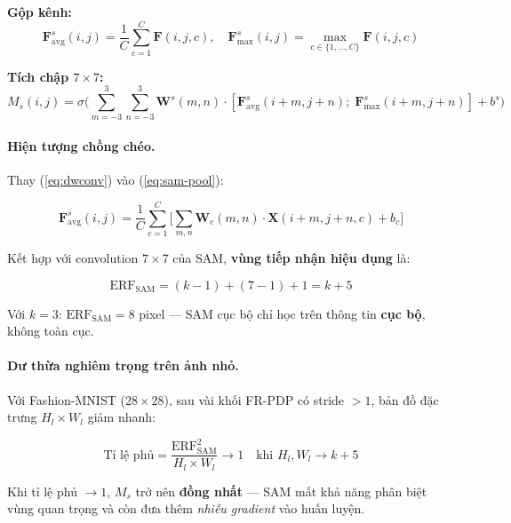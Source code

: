 \documentclass[
]{article}
\begin{document}
\textbf{Gộp kênh:}
\begin{equation}
\mathbf{F}_{\text{avg}}^s(i,j) = \frac{1}{C}\sum_{c=1}^{C} \mathbf{F}(i,j,c), \quad
\mathbf{F}_{\text{max}}^s(i,j) = \max_{c \in \{1,\ldots,C\}} \mathbf{F}(i,j,c)
\label{eq:sam-pool}
\end{equation}

\textbf{Tích chập $7 \times 7$:}
\begin{equation}
M_s(i,j) = \sigma\Bigg(\sum_{m=-3}^{3}\sum_{n=-3}^{3} \mathbf{W}^s(m,n) \cdot [\mathbf{F}_{\text{avg}}^s(i+m,j+n);\; \mathbf{F}_{\text{max}}^s(i+m,j+n)] + b^s\Bigg)
\label{eq:sam-conv}
\end{equation}

\paragraph{Hiện tượng chồng chéo.}

Thay (\ref{eq:dwconv}) vào (\ref{eq:sam-pool}):

\begin{equation}
\mathbf{F}_{\text{avg}}^s(i,j) = \frac{1}{C}\sum_{c=1}^{C}\Bigg[\sum_{m,n} \mathbf{W}_c(m,n) \cdot \mathbf{X}(i+m,j+n,c) + b_c\Bigg]
\label{eq:overlap}
\end{equation}

Kết hợp với convolution $7 \times 7$ của SAM, \textbf{vùng tiếp nhận hiệu dụng} là:

\begin{equation}
\text{ERF}_{\text{SAM}} = (k - 1) + (7 - 1) + 1 = k + 5
\label{eq:erf}
\end{equation}

Với $k = 3$: $\text{ERF}_{\text{SAM}} = 8$ pixel --- SAM cục bộ chỉ học trên thông tin \textbf{cục bộ}, không toàn cục.

\paragraph{Dư thừa nghiêm trọng trên ảnh nhỏ.}

Với Fashion-MNIST ($28 \times 28$), sau vài khối FR-PDP có stride $> 1$, bản đồ đặc trưng $H_l \times W_l$ giảm nhanh:

\begin{equation}
\text{Tỉ lệ phủ} = \frac{\text{ERF}_{\text{SAM}}^2}{H_l \times W_l} \rightarrow 1 \quad \text{khi } H_l, W_l \rightarrow k + 5
\label{eq:coverage}
\end{equation}

Khi tỉ lệ phủ $\rightarrow 1$, $M_s$ trở nên \textbf{đồng nhất} --- SAM mất khả năng phân biệt vùng quan trọng và còn đưa thêm \textit{nhiễu gradient} vào huấn luyện.
\end{document}
